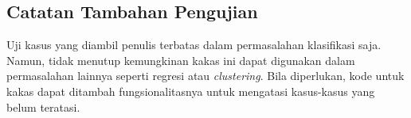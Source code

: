 \subsection{Catatan Tambahan Pengujian}

Uji kasus yang diambil penulis terbatas dalam permasalahan klasifikasi saja.
Namun, tidak menutup kemungkinan kakas ini dapat digunakan dalam permasalahan lainnya seperti regresi atau \textit{clustering}.
Bila diperlukan, kode untuk kakas dapat ditambah fungsionalitasnya untuk mengatasi kasus-kasus yang belum teratasi.
